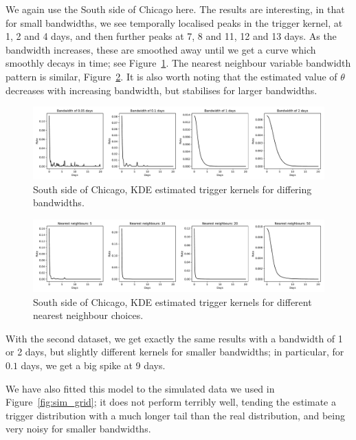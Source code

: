 \documentclass[twoside,a4paper]{article}
\theoremstyle{plain}
\theoremstyle{definition}
\begin{document}
We again use the South side of Chicago here.  The results are interesting, in that for small
bandwidths, we see temporally localised peaks in the trigger kernel, at 1, 2 and 4 days,
and then further peaks at 7, 8 and 11, 12 and 13 days.  As the bandwidth increases, these
are smoothed away until we get a curve which smoothly decays in time; see
Figure~\ref{fig:grid_kde_trigger}.  The nearest neighbour variable bandwidth pattern is
similar, Figure~\ref{fig:grid_kdenn_trigger}.  It is also worth noting that the estimated
value of $\theta$ decreases with increasing bandwidth, but stabilises for larger bandwidths.

\begin{figure}
  \includegraphics[width=\textwidth]{../notebooks/grid_kde_by_bandwidth.pdf}
  \caption{South side of Chicago, KDE estimated trigger kernels for differing bandwidths.}
  \label{fig:grid_kde_trigger}
\end{figure}

\begin{figure}
  \includegraphics[width=\textwidth]{../notebooks/grid_kde_by_nn.pdf}
  \caption{South side of Chicago, KDE estimated trigger kernels for different nearest neighbour
  choices.}
  \label{fig:grid_kdenn_trigger}
\end{figure}

With the second dataset, we get exactly the same results with a bandwidth of 1 or 2 days,
but slightly different kernels for smaller bandwidths; in particular, for $0.1$ days, we get
a big spike at 9 days.

We have also fitted this model to the simulated data we used in Figure~\ref{fig:sim_grid};
it does not perform terribly well, tending the estimate a trigger distribution with a much
longer tail than the real distribution, and being very noisy for smaller bandwidths.
\end{document}
